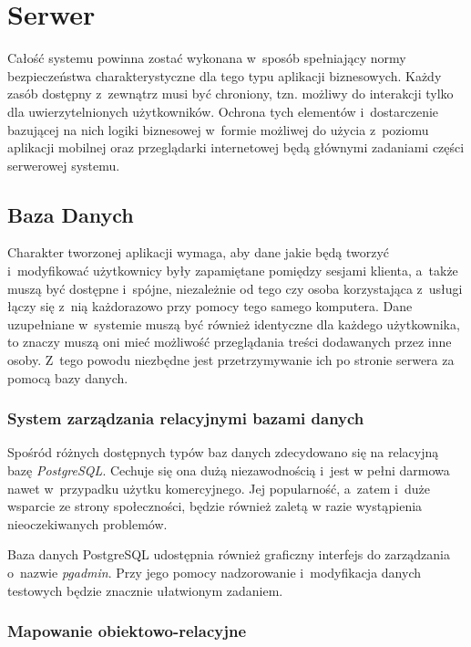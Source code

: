 \documentclass[11pt]{aghdpl}
\begin{document}
\section {Serwer}

Całość systemu powinna zostać wykonana w~sposób spełniający normy bezpieczeństwa charakterystyczne dla tego typu aplikacji biznesowych. Każdy zasób dostępny z~zewnątrz musi być chroniony, tzn. możliwy do interakcji tylko dla uwierzytelnionych użytkowników. Ochrona tych elementów i~dostarczenie bazującej na nich logiki biznesowej w~formie możliwej do użycia z~poziomu aplikacji mobilnej oraz przeglądarki internetowej będą głównymi zadaniami części serwerowej systemu.

\subsection{Baza Danych}
\label{sec:bazaDanych}

Charakter tworzonej aplikacji wymaga, aby dane jakie będą tworzyć i~modyfikować użytkownicy były zapamiętane pomiędzy sesjami klienta, a~także muszą być dostępne i~spójne, niezależnie od tego czy osoba korzystająca z~usługi łączy się z~nią każdorazowo przy pomocy tego samego komputera. Dane uzupełniane w~systemie muszą być również identyczne dla każdego użytkownika, to znaczy muszą oni mieć możliwość przeglądania treści dodawanych przez inne osoby. Z~tego powodu niezbędne jest przetrzymywanie ich po stronie serwera za pomocą bazy danych.

\subsubsection{System zarządzania relacyjnymi bazami danych}

Spośród różnych dostępnych typów baz danych zdecydowano się na relacyjną bazę \emph{PostgreSQL}. Cechuje się ona dużą niezawodnością i~jest w pełni darmowa nawet w~przypadku użytku komercyjnego. Jej popularność, a~zatem i~duże wsparcie ze strony społeczności, będzie również zaletą w razie wystąpienia nieoczekiwanych problemów.

Baza danych PostgreSQL udostępnia również graficzny interfejs do zarządzania o~nazwie \emph{pgadmin}. Przy jego pomocy nadzorowanie i~modyfikacja danych testowych będzie znacznie ułatwionym zadaniem.

\subsubsection{Mapowanie obiektowo-relacyjne}
\end{document}
